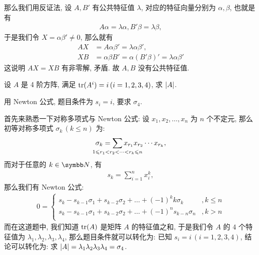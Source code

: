 \begin{exercise}[series=exer]
\begin{answer}
        那么我们用反证法, 设 $ A, B' $ 有公共特征值 $ \lambda $, 对应的特征向量分别为 $ \alpha, \beta $, 也就是有
        \begin{align*}
            A\alpha = \lambda\alpha, B'\beta = \lambda\beta,
        \end{align*}
        于是我们令 $ X = \alpha\beta' \ne 0 $, 那么就有
        \begin{align*}
            AX & = A\alpha\beta' = \lambda\alpha\beta',\\
            XB & = \alpha\beta B' = \alpha(B'\beta)' = \lambda\alpha\beta'
        \end{align*}
        这说明 $ AX = XB $ 有非零解, 矛盾. 故 $ A, B $ 没有公共特征值.
    \end{answer}
    \item 设 $ A $ 是 4 阶方阵, 满足 $ \tr(A^{i}) = i\,(i = 1, 2, 3, 4) $, 求 $ \abs{A} $. 
    \begin{hint}
        用 Newton 公式, 题目条件为 $ s_{i} = i $, 要求 $ \sigma_{4} $. 
    \end{hint}
    \begin{answer}
        首先来熟悉一下对称多项式与 Newton 公式: 设 $ x_{1}, x_{2}, \dots, x_{n} $ 为 $ n $ 个不定元, 那么初等对称多项式 $ \sigma_{k}\,(k \le n) $ 为:
        \begin{align*}
            \sigma_{k} = \sum_{\mathclap{1 \le r_{1} < r_{2} < \dots < r_{k} \le n}} x_{r_{1}}x_{r_{2}}\dotsm x_{r_{k}},
        \end{align*} 
        而对于任意的 $ k \in \N $, 有
        \begin{align*}
            s_{k} = \sum_{i = 1}^{n}x_{i}^{k},
        \end{align*}
        那么我们有 Newton 公式:
        \begin{align*}
            0 = \begin{cases}
                s_{k} - s_{k - 1}\sigma_{1} + s_{k - 2}\sigma_{2} + \dots + (-1)^{k}k\sigma_{k} & , k \le n \\
                s_{k} - s_{k - 1}\sigma_{1} + s_{k - 2}\sigma_{2} + \dots + (-1)^{n}s_{k - n}\sigma_{n} & , k > n\\
            \end{cases}
        \end{align*}
        而在这道题中, 我们知道 $ \tr(A) $ 是矩阵 $ A $ 的特征值之和, 于是我们令 $ A $ 的 $ 4 $ 个特征值为 $ \lambda_{1}, \lambda_{2}, \lambda_{3}, \lambda_{4} $, 那么题目条件就可以转化为: 已知 $ s_{i} = i\,(i = 1, 2, 3, 4) $, 结论可以转化为: 求 $ \abs{A} = \lambda_{1}\lambda_{2}\lambda_{3}\lambda_{4} = \sigma_{4} $.
        

\end{answer}
\end{exercise}
